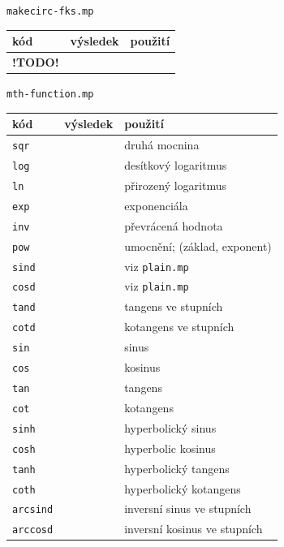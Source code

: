\documentclass[a4paper,10pt]{article}
\begin{document}
{\centering\large\texttt{makecirc-fks.mp}\nopagebreak\\\medskip\noindent}
\begin{tabularx}{\textwidth}{|l|l|X|}\hline
    kód & výsledek & použití\\\hline
    {\bf !TODO!}&&\\\hline
\end{tabularx}\bigskip

{\centering\large\texttt{mth-function.mp}\nopagebreak\\\medskip\noindent}
\begin{tabularx}{\textwidth}{|l|l|X|}\hline
    kód & výsledek & použití\\\hline
    \verb+sqr+  && druhá mocnina\\\hline
    \verb+log+  && desítkový logaritmus\\\hline
    \verb+ln+   && přirozený logaritmus\\\hline
    \verb+exp+  && exponenciála\\\hline
    \verb+inv+  && převrácená hodnota\\\hline
    \verb+pow+  && umocnění; (základ, exponent)\\\hline
    \hline
    \verb+sind+ && viz {\tt plain.mp}\\\hline
    \verb+cosd+ && viz {\tt plain.mp}\\\hline
    \verb+tand+ && tangens ve stupních\\\hline
    \verb+cotd+ && kotangens ve stupních\\\hline
    \verb+sin+  && sinus\\\hline
    \verb+cos+  && kosinus\\\hline
    \verb+tan+  && tangens\\\hline
    \verb+cot+  && kotangens\\\hline
    \hline
    \verb+sinh+ && hyperbolický sinus\\\hline
    \verb+cosh+ && hyperbolic kosinus\\\hline
    \verb+tanh+ && hyperbolický tangens\\\hline
    \verb+coth+ && hyperbolický kotangens\\\hline
    \hline
    \verb+arcsind+ && inversní sinus ve stupních\\\hline
    \verb+arccosd+ && inversní kosinus ve stupních\\\hline

\end{tabularx}
\end{document}
